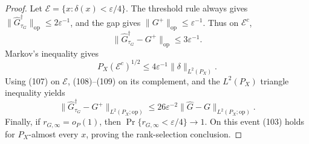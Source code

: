 \documentclass{article}
\begin{document}
\begin{proof}
Let \(\mathcal E=\{x:\delta(x)<\varepsilon/4\}\).  The threshold rule always gives
\(\|\widehat G_{\tau_G}^{\dagger}\|_{\mathrm{op}}\leq2\varepsilon^{-1}\), and the gap gives \(\|G^+\|_{\mathrm{op}}\leq\varepsilon^{-1}\).  Thus on \(\mathcal E^c\),
\[
 \|\widehat G_{\tau_G}^{\dagger}-G^+\|_{\mathrm{op}}
 \leq3\varepsilon^{-1}. \tag{108}
\]
Markov's inequality gives
\[
 P_X(\mathcal E^c)^{1/2}
 \leq4\varepsilon^{-1}\|\delta\|_{L^2(P_X)}. \tag{109}
\]
Using (107) on \(\mathcal E\), (108)--(109) on its complement, and the \(L^2(P_X)\) triangle inequality yields
\[
 \|\widehat G_{\tau_G}^{\dagger}-G^+\|_{L^2(P_X;\mathrm{op})}
 \leq26\varepsilon^{-2}
 \|\widehat G-G\|_{L^2(P_X;\mathrm{op})}. \tag{110}
\]
Finally, if \(r_{G,\infty}=o_P(1)\), then
\(\Pr\{r_{G,\infty}<\varepsilon/4\}\to1\).  On this event (103) holds for \(P_X\)-almost every \(x\), proving the rank-selection conclusion.
\end{proof}
\end{document}
